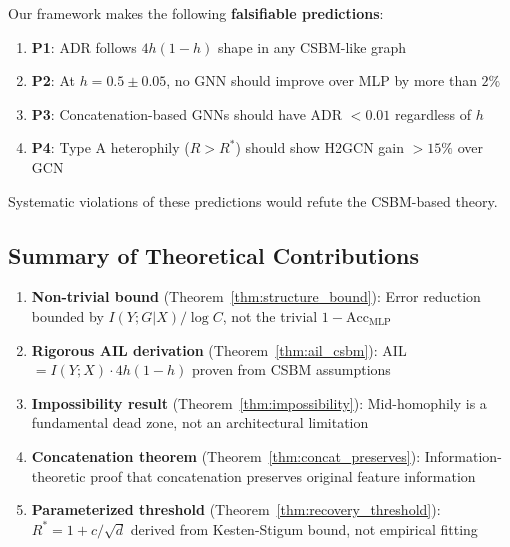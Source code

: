 \begin{remark}
\label{rem:falsifiable_rigorous}
Our framework makes the following \textbf{falsifiable predictions}:
\begin{enumerate}
    \item \textbf{P1}: ADR follows $4h(1-h)$ shape in any CSBM-like graph
    \item \textbf{P2}: At $h = 0.5 \pm 0.05$, no GNN should improve over MLP by more than $2\%$
    \item \textbf{P3}: Concatenation-based GNNs should have ADR $< 0.01$ regardless of $h$
    \item \textbf{P4}: Type A heterophily ($R > R^*$) should show H2GCN gain $> 15\%$ over GCN
\end{enumerate}
Systematic violations of these predictions would refute the CSBM-based theory.
\end{remark}

\subsection{Summary of Theoretical Contributions}

\begin{enumerate}
    \item \textbf{Non-trivial bound} (Theorem~\ref{thm:structure_bound}): Error reduction bounded by $I(Y;G|X)/\log C$, not the trivial $1 - \text{Acc}_{\text{MLP}}$

    \item \textbf{Rigorous AIL derivation} (Theorem~\ref{thm:ail_csbm}): AIL $= I(Y;X) \cdot 4h(1-h)$ proven from CSBM assumptions

    \item \textbf{Impossibility result} (Theorem~\ref{thm:impossibility}): Mid-homophily is a fundamental dead zone, not an architectural limitation

    \item \textbf{Concatenation theorem} (Theorem~\ref{thm:concat_preserves}): Information-theoretic proof that concatenation preserves original feature information

    \item \textbf{Parameterized threshold} (Theorem~\ref{thm:recovery_threshold}): $R^* = 1 + c/\sqrt{d}$ derived from Kesten-Stigum bound, not empirical fitting
\end{enumerate}

